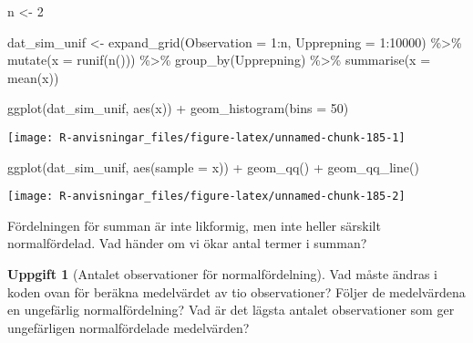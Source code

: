 \documentclass[
]{book}
\newenvironment{Shaded}{\begin{snugshade}}{\end{snugshade}}
\newcommand{\AttributeTok}[1]{\textcolor[rgb]{0.77,0.63,0.00}{#1}}
\newcommand{\DecValTok}[1]{\textcolor[rgb]{0.00,0.00,0.81}{#1}}
\newcommand{\FunctionTok}[1]{\textcolor[rgb]{0.00,0.00,0.00}{#1}}
\newcommand{\NormalTok}[1]{#1}
\newcommand{\OtherTok}[1]{\textcolor[rgb]{0.56,0.35,0.01}{#1}}
\newcommand{\SpecialCharTok}[1]{\textcolor[rgb]{0.00,0.00,0.00}{#1}}
\theoremstyle{definition}
\theoremstyle{definition}
\theoremstyle{definition}
\newtheorem{exercise}{Uppgift}[chapter]
\theoremstyle{definition}
\theoremstyle{remark}
\begin{document}
\begin{Shaded}
\begin{Highlighting}[]
\NormalTok{n }\OtherTok{\textless{}{-}} \DecValTok{2}

\NormalTok{dat\_sim\_unif }\OtherTok{\textless{}{-}} \FunctionTok{expand\_grid}\NormalTok{(}\AttributeTok{Observation =} \DecValTok{1}\SpecialCharTok{:}\NormalTok{n, }\AttributeTok{Upprepning =} \DecValTok{1}\SpecialCharTok{:}\DecValTok{10000}\NormalTok{) }\SpecialCharTok{\%\textgreater{}\%} 
  \FunctionTok{mutate}\NormalTok{(}\AttributeTok{x =} \FunctionTok{runif}\NormalTok{(}\FunctionTok{n}\NormalTok{())) }\SpecialCharTok{\%\textgreater{}\%} 
  \FunctionTok{group\_by}\NormalTok{(Upprepning) }\SpecialCharTok{\%\textgreater{}\%} 
  \FunctionTok{summarise}\NormalTok{(}\AttributeTok{x =} \FunctionTok{mean}\NormalTok{(x))}

\FunctionTok{ggplot}\NormalTok{(dat\_sim\_unif, }\FunctionTok{aes}\NormalTok{(x)) }\SpecialCharTok{+} \FunctionTok{geom\_histogram}\NormalTok{(}\AttributeTok{bins =} \DecValTok{50}\NormalTok{)}
\end{Highlighting}
\end{Shaded}

\begin{center}\texttt{[image: R-anvisningar\_files/figure-latex/unnamed-chunk-185-1]} \end{center}

\begin{Shaded}
\begin{Highlighting}[]
\FunctionTok{ggplot}\NormalTok{(dat\_sim\_unif, }\FunctionTok{aes}\NormalTok{(}\AttributeTok{sample =}\NormalTok{ x)) }\SpecialCharTok{+} \FunctionTok{geom\_qq}\NormalTok{() }\SpecialCharTok{+} \FunctionTok{geom\_qq\_line}\NormalTok{()}
\end{Highlighting}
\end{Shaded}

\begin{center}\texttt{[image: R-anvisningar\_files/figure-latex/unnamed-chunk-185-2]} \end{center}

Fördelningen för summan är inte likformig, men inte heller särskilt normalfördelad. Vad händer om vi ökar antal termer i summan?

\begin{exercise}[Antalet observationer för normalfördelning]
Vad måste ändras i koden ovan för beräkna medelvärdet av tio observationer? Följer de medelvärdena en ungefärlig normalfördelning? Vad är det lägsta antalet observationer som ger ungefärligen normalfördelade medelvärden?
\end{exercise}
\end{document}

